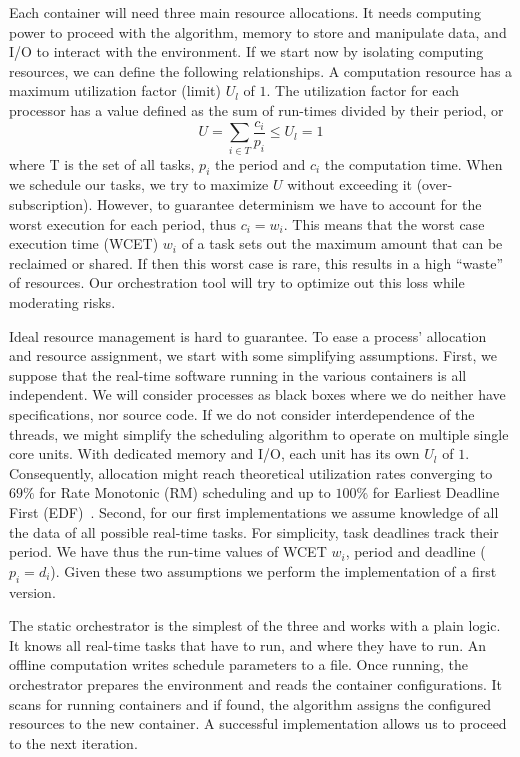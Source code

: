 \documentclass[]{scrartcl}
\begin{document}
Each container will need three main resource allocations.
It needs computing power to proceed with the algorithm, memory to store and manipulate data, and I/O to interact with the environment.
If we start now by isolating computing resources, we can define the following relationships.
A computation resource has a maximum utilization factor (limit) $U_l$ of $1$.
The utilization factor for each processor has a value defined as the sum of run-times divided by their period, or
\begin{equation}
	U = \sum_{i \in T}^{}{\frac{c_i}{p_i}} \leq U_l = 1
\end{equation}  
where T is the set of all tasks, $p_i$ the period and $c_i$ the computation time.
When we schedule our tasks, we try to maximize $U$ without exceeding it (over-subscription).
However, to guarantee determinism we have to account for the worst execution for each period, thus $c_i = w_i$.
This means that the worst case execution time (WCET) $w_i$ of a task sets out the maximum amount that can be reclaimed or shared.
If then this worst case is rare, this results in a high ``waste'' of resources.
Our orchestration tool will try to optimize out this loss while moderating risks.

Ideal resource management is hard to guarantee.
To ease a process' allocation and resource assignment, we start with some simplifying assumptions.
First, we suppose that the real-time software running in the various containers is all independent.
We will consider processes as black boxes where we do neither have specifications, nor source code.
If we do not consider interdependence of the threads, we might simplify the scheduling algorithm to operate on multiple single core units. 
With dedicated memory and I/O, each unit has its own $U_l$ of $1$.
Consequently, allocation might reach theoretical utilization rates converging to $69\%$ for Rate Monotonic (RM) scheduling and up to $100\%$ for Earliest Deadline First (EDF)~\cite{Buttazzo2011}. 
Second, for our first implementations we assume knowledge of all the data of all possible real-time tasks.
For simplicity, task deadlines track their period.
We have thus the run-time values of WCET $w_i$, period and deadline ($p_i = d_i$).
Given these two assumptions we perform the implementation of a first version. 

The static orchestrator is the simplest of the three and works with a plain logic. 
It knows all real-time tasks that have to run, and where they have to run. 
An offline computation writes schedule parameters to a file. 
Once running, the orchestrator prepares the environment and reads the container configurations.
It scans for running containers and if found, the algorithm assigns the configured resources to the new container.
A successful implementation allows us to proceed to the next iteration.
\end{document}
